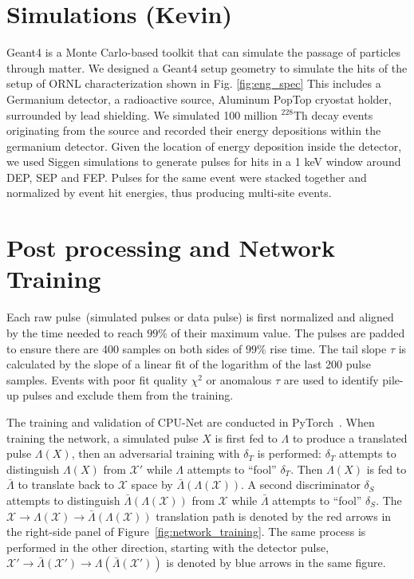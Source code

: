 \section{Simulations (Kevin)}
Geant4 is a Monte Carlo-based toolkit that can simulate the passage of particles through matter. We designed a Geant4 setup geometry to simulate the hits of the setup of ORNL characterization shown in Fig. \ref{fig:eng_spec} This includes a Germanium detector, a radioactive source, Aluminum PopTop cryostat holder, surrounded by lead shielding. We simulated 100 million $^{228}$Th decay events originating from the source and recorded their energy depositions within the germanium detector. Given the location of energy deposition inside the detector, we used Siggen simulations to generate pulses for hits in a 1 keV window around DEP, SEP and FEP. Pulses for the same event were stacked together and normalized by event hit energies, thus producing multi-site events.

\section{Post processing and Network Training}
Each raw pulse~(simulated pulses or data pulse) is first normalized and aligned by the time needed to reach $99\%$ of their maximum value. The pulses are padded to ensure there are 400 samples on both sides of $99\%$ rise time. The tail slope $\tau$ is calculated by the slope of a linear fit of the logarithm of the last 200 pulse samples. Events with poor fit quality $\chi^2$ or anomalous $\tau$ are used to identify pile-up pulses and exclude them from the training.


The training and validation of CPU-Net are conducted in PyTorch~\cite{pytorch}. When training the network, a simulated pulse $X$ is first fed to $\Lambda$ to produce a translated pulse $\Lambda(X)$, then an adversarial training with $\delta_{T}$ is performed: $\delta_{T}$ attempts to distinguish $\Lambda(X)$ from $\mathcal{X}'$ while $\Lambda$ attempts to ``fool'' $\delta_{T}$. Then $\Lambda(X)$ is fed to $\bar{\Lambda}$ to translate back to $\mathcal{X}$ space by $\bar{\Lambda}(\Lambda(\mathcal{X}))$. A second discriminator $\delta_{S}$ attempts to distinguish $\bar{\Lambda}(\Lambda(\mathcal{X}))$ from $\mathcal{X}$ while $\bar{\Lambda}$ attempts to ``fool'' $\delta_{S}$. The $\mathcal{X}\rightarrow{}\Lambda(\mathcal{X})\rightarrow{}\bar{\Lambda}(\Lambda(\mathcal{X}))$ translation path is denoted by the red arrows in the right-side panel of Figure~\ref{fig:network_training}. The same process is performed in the other direction, starting with the detector pulse, $\mathcal{X}'\rightarrow{}\bar{\Lambda}(\mathcal{X}')\rightarrow{}\Lambda(\bar{\Lambda}(\mathcal{X}'))$ is denoted by blue arrows in the same figure.  

